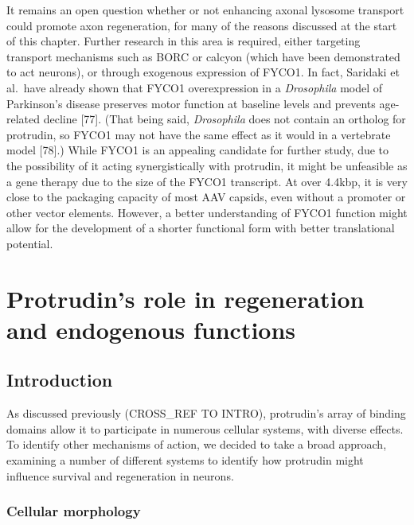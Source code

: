 \documentclass[
  12pt,
  a4paper,
]{book}
\begin{document}
It remains an open question whether or not enhancing axonal lysosome transport could promote axon regeneration, for many of the reasons discussed at the start of this chapter. Further research in this area is required, either targeting transport mechanisms such as BORC or calcyon (which have been demonstrated to act neurons), or through exogenous expression of FYCO1. In fact, Saridaki et al.~have already shown that FYCO1 overexpression in a \emph{Drosophila} model of Parkinson's disease preserves motor function at baseline levels and prevents age-related decline {[}77{]}. (That being said, \emph{Drosophila} does not contain an ortholog for protrudin, so FYCO1 may not have the same effect as it would in a vertebrate model {[}78{]}.) While FYCO1 is an appealing candidate for further study, due to the possibility of it acting synergistically with protrudin, it might be unfeasible as a gene therapy due to the size of the FYCO1 transcript. At over 4.4kbp, it is very close to the packaging capacity of most AAV capsids, even without a promoter or other vector elements. However, a better understanding of FYCO1 function might allow for the development of a shorter functional form with better translational potential.

\hypertarget{protrudins-role-in-regeneration-and-endogenous-functions}{%
\chapter{Protrudin's role in regeneration and endogenous functions}\label{protrudins-role-in-regeneration-and-endogenous-functions}}


\hypertarget{introduction-1}{%
\section{Introduction}\label{introduction-1}}

As discussed previously (CROSS\_REF TO INTRO), protrudin's array of binding domains allow it to participate in numerous cellular systems, with diverse effects. To identify other mechanisms of action, we decided to take a broad approach, examining a number of different systems to identify how protrudin might influence survival and regeneration in neurons.

\hypertarget{cellular-morphology}{%
\subsection{Cellular morphology}\label{cellular-morphology}}
\end{document}
